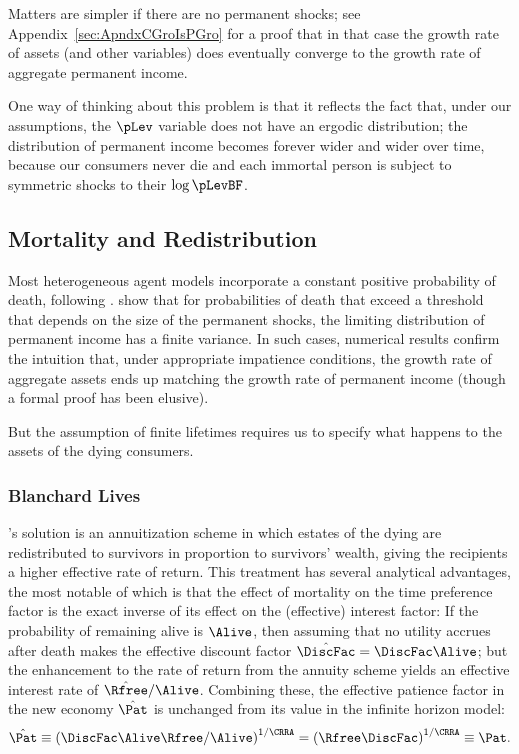 \documentclass[BufferStockTheory]{subfiles}
\begin{document}
Matters are simpler if there are no permanent shocks; see Appendix~\ref{sec:ApndxCGroIsPGro} for a proof that in that case the growth rate of assets (and other variables) does eventually converge to the growth rate of aggregate permanent income.

One way of thinking about this problem is that it reflects the fact that, under our assumptions, the $\pLev$ variable does not have an ergodic distribution; the distribution of permanent income becomes forever wider and wider over time, because our consumers never die and each immortal person is subject to symmetric shocks to their $\log \pLevBF$.


\hypertarget{Mortality-And-Redistribution}{}
\subsection{Mortality and Redistribution}\label{sec:Mortality-And-Redistribution}

Most heterogeneous agent models incorporate a constant positive probability of death, following \cite{blanchardFinite}.  \cite{cstwMPC} show that for probabilities of death that exceed a threshold that depends on the size of the permanent shocks, the limiting distribution of permanent income has a finite variance.  In such cases, numerical results confirm the intuition that, under appropriate impatience conditions, the growth rate of aggregate assets ends up matching the growth rate of permanent income (though a formal proof has been elusive).

But the assumption of finite lifetimes requires us to specify what happens to the assets of the dying consumers. 

\hypertarget{Blanchard-Lives}{}
\subsubsection{Blanchard Lives}

\cite{blanchardFinite}'s solution is an annuitization scheme in which estates of the dying are redistributed to survivors in proportion to survivors' wealth, giving the recipients a higher effective rate of return. This treatment has several analytical advantages, the most notable of which is that the effect of mortality on the time preference factor is the exact inverse of its effect on the (effective) interest factor:  If the probability of remaining alive is $\Alive$, then assuming that no utility accrues after death makes the effective discount factor $\hat{\DiscFac}=\DiscFac\Alive$; but the enhancement to the rate of return from the annuity scheme yields an effective interest rate of $\hat{\Rfree}/\Alive$.  Combining these, the effective patience factor in the new economy $\hat{\Pat}$ is unchanged from its value in the infinite horizon model:
\begin{equation}
  \hat{\Pat} \equiv \left(\DiscFac \Alive \Rfree / \Alive\right)^{1/\CRRA} = \left(\Rfree \DiscFac\right)^{1/\CRRA} \equiv \Pat.
\end{equation}
\end{document}
